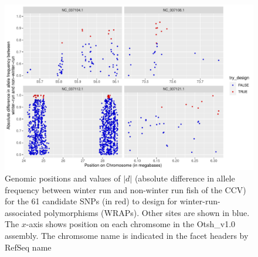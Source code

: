 \begin{figure}
\includegraphics[width=\textwidth]{images/wrap-candi.pdf}
\caption[
	61 candidates for primer design for winter-run-associated polymorphisms
]{
	\footnotesize Genomic positions and values of $|d|$ (absolute difference in
	allele frequency between winter run and non-winter run fish of the CCV)
	for the 61 candidate SNPs (in red) to design for winter-run-associated polymorphisms
	(WRAPs).  Other sites are shown in blue.  The $x$-axis shows position on
	each chromsome in the Otsh\_v1.0 assembly.  The chromsome name is indicated in the facet headers by
	RefSeq name
}
\label{fig:wrap-candi}
\end{figure}

